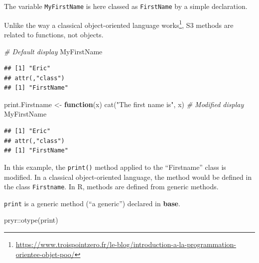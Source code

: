 \documentclass[
  12pt,
  american,
  a4paper,
  extrafontsizes,onecolumn,openright
  ]{memoir}
\newenvironment{Shaded}{\begin{snugshade}}{\end{snugshade}}
\newcommand{\CommentTok}[1]{\textcolor[rgb]{0.56,0.35,0.01}{\textit{#1}}}
\newcommand{\ControlFlowTok}[1]{\textcolor[rgb]{0.13,0.29,0.53}{\textbf{#1}}}
\newcommand{\FunctionTok}[1]{\textcolor[rgb]{0.00,0.00,0.00}{#1}}
\newcommand{\NormalTok}[1]{#1}
\newcommand{\OtherTok}[1]{\textcolor[rgb]{0.56,0.35,0.01}{#1}}
\newcommand{\SpecialCharTok}[1]{\textcolor[rgb]{0.00,0.00,0.00}{#1}}
\newcommand{\StringTok}[1]{\textcolor[rgb]{0.31,0.60,0.02}{#1}}
\begin{document}
\normalsize

The variable \texttt{MyFirstName} is here classed as \texttt{FirstName} by a simple declaration.

Unlike the way a classical object-oriented language works\footnote{\url{https://www.troispointzero.fr/le-blog/introduction-a-la-programmation-orientee-objet-poo/}}, S3 methods are related to functions, not objects.

\scriptsize

\begin{Shaded}
\begin{Highlighting}[]
\CommentTok{\# Default display}
\NormalTok{MyFirstName}
\end{Highlighting}
\end{Shaded}

\begin{verbatim}
## [1] "Eric"
## attr(,"class")
## [1] "FirstName"
\end{verbatim}

\begin{Shaded}
\begin{Highlighting}[]
\NormalTok{print.Firstname }\OtherTok{\textless{}{-}} \ControlFlowTok{function}\NormalTok{(x) }\FunctionTok{cat}\NormalTok{(}\StringTok{"The first name is"}\NormalTok{, x)}
\CommentTok{\# Modified display}
\NormalTok{MyFirstName}
\end{Highlighting}
\end{Shaded}

\begin{verbatim}
## [1] "Eric"
## attr(,"class")
## [1] "FirstName"
\end{verbatim}

\normalsize

In this example, the \texttt{print()} method applied to the \enquote{Firstname} class is modified.
In a classical object-oriented language, the method would be defined in the class \texttt{Firstname}.
In R, methods are defined from generic methods.

\texttt{print} is a generic method (\enquote{a generic}) declared in \textbf{base}.

\scriptsize

\begin{Shaded}
\begin{Highlighting}[]
\NormalTok{pryr}\SpecialCharTok{::}\FunctionTok{otype}\NormalTok{(print)}
\end{Highlighting}
\end{Shaded}
\end{document}
